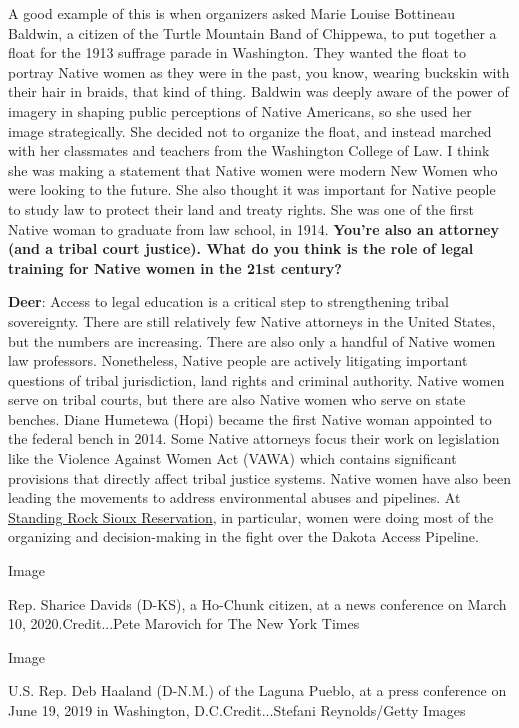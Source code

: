 A good example of this is when organizers asked Marie Louise Bottineau
Baldwin, a citizen of the Turtle Mountain Band of Chippewa, to put
together a float for the 1913 suffrage parade in Washington. They wanted
the float to portray Native women as they were in the past, you know,
wearing buckskin with their hair in braids, that kind of thing. Baldwin
was deeply aware of the power of imagery in shaping public perceptions
of Native Americans, so she used her image strategically. She decided
not to organize the float, and instead marched with her classmates and
teachers from the Washington College of Law. I think she was making a
statement that Native women were modern New Women who were looking to
the future. She also thought it was important for Native people to study
law to protect their land and treaty rights. She was one of the first
Native woman to graduate from law school, in 1914. \textbf{You're also
an attorney (and a tribal court justice). What do you think is the role
of legal training for Native women in the 21st century?}

\textbf{Deer}: Access to legal education is a critical step to
strengthening tribal sovereignty. There are still relatively few Native
attorneys in the United States, but the numbers are increasing. There
are also only a handful of Native women law professors. Nonetheless,
Native people are actively litigating important questions of tribal
jurisdiction, land rights and criminal authority. Native women serve on
tribal courts, but there are also Native women who serve on state
benches. Diane Humetewa (Hopi) became the first Native woman appointed
to the federal bench in 2014. Some Native attorneys focus their work on
legislation like the Violence Against Women Act (VAWA) which contains
significant provisions that directly affect tribal justice systems.
Native women have also been leading the movements to address
environmental abuses and pipelines. At
\href{https://www.nytimes3xbfgragh.onion/2017/01/31/magazine/the-youth-group-that-launched-a-movement-at-standing-rock.html}{Standing
Rock Sioux Reservation}, in particular, women were doing most of the
organizing and decision-making in the fight over the Dakota Access
Pipeline.

Image

Rep. Sharice Davids (D-KS), a Ho-Chunk citizen, at a news conference on
March 10, 2020.Credit...Pete Marovich for The New York Times

Image

U.S. Rep. Deb Haaland (D-N.M.) of the Laguna Pueblo, at a press
conference on June 19, 2019 in Washington, D.C.Credit...Stefani
Reynolds/Getty Images

